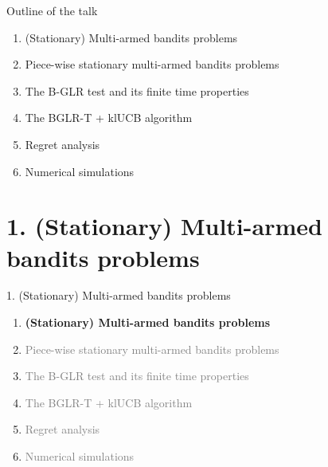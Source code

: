 \documentclass[11pt,english,ignorenonframetext,]{beamer}
\begin{document}
\begin{frame}{Outline of the talk}

  \begin{enumerate}
    \item
      (Stationary) Multi-armed bandits problems
    \vspace*{15pt}

    \item
      Piece-wise stationary multi-armed bandits problems
    \vspace*{15pt}

    \item
      The B-GLR test and its finite time properties
    \vspace*{15pt}

    \item
      The BGLR-T + klUCB algorithm
    \vspace*{15pt}

    \item
      Regret analysis
    \vspace*{15pt}

    \item
      Numerical simulations
  \end{enumerate}

\end{frame}


\section{\hfill{}1. (Stationary) Multi-armed bandits problems\hfill{}}

\begin{frame}{1. (Stationary) Multi-armed bandits problems}

  \begin{enumerate}
    \item
    \alert{\textbf{%
      (Stationary) Multi-armed bandits problems
    }}
    \vspace*{15pt}

    \item
    \textcolor{gray}{
      Piece-wise stationary multi-armed bandits problems
    }
    \vspace*{15pt}

    \item
    \textcolor{gray}{
      The B-GLR test and its finite time properties
    }
    \vspace*{15pt}

    \item
    \textcolor{gray}{
      The BGLR-T + klUCB algorithm
    }
    \vspace*{15pt}

    \item
    \textcolor{gray}{
      Regret analysis
    }
    \vspace*{15pt}

    \item
    \textcolor{gray}{
      Numerical simulations
    }
  \end{enumerate}

\end{frame}
\end{document}
